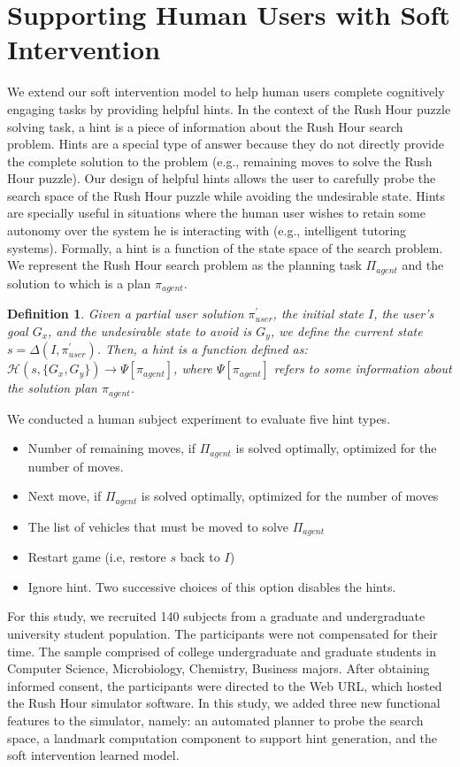 \documentclass[doctor]{thesis} %
\theoremstyle{plain}
\newtheorem{definition}{Definition}
\begin{document}
\section*{Supporting Human Users with Soft Intervention}
We extend our soft intervention model to help human users complete cognitively engaging tasks by providing helpful hints. In the context of the Rush Hour puzzle solving task, a hint is a piece of information about the Rush Hour search problem. Hints are a special type of answer because they do not directly provide the complete solution to the problem (e.g., remaining moves to solve the Rush Hour puzzle). Our design of helpful hints allows the user to carefully probe the search space of the Rush Hour puzzle while avoiding the undesirable state. Hints are specially useful in situations where the human user wishes to retain some autonomy over the system he is interacting with (e.g., intelligent tutoring systems).
Formally, a hint is a function of the state space of the search problem. We represent the Rush Hour search problem as the planning task $\Pi_{agent}$ and the solution to which is a plan $\pi_{agent}$.
\begin{definition}
Given a partial user solution $\pi^\prime _{user}$, the initial state $I$, the user's goal $G_x$, and the undesirable state to avoid is $G_y$, we define the current state $s = \Delta (I,\pi^\prime _{user})$. Then, a hint is a function defined as: $\mathcal{H}(s,\lbrace G_x,G_y\rbrace) \rightarrow \Psi[\pi_{agent}]$, where $\Psi[\pi_{agent}]$ refers to some information about the solution plan $\pi_{agent}$.
\end{definition}
We conducted a human subject experiment to evaluate five hint types.
\begin{itemize}
\item Number of remaining moves, if $\Pi_{agent}$ is solved optimally, optimized for the number of moves.
\item Next move, if $\Pi_{agent}$ is solved optimally, optimized for the number of moves
\item The list of vehicles that must be moved to solve $\Pi_{agent}$
\item Restart game (i.e, restore $s$ back to $I$)
\item Ignore hint. Two successive choices of this option disables the hints.
\end{itemize}

For this study, we recruited 140 subjects from a graduate and undergraduate university student population. The participants were not compensated for their time. The sample comprised of college undergraduate and graduate students in Computer Science, Microbiology, Chemistry, Business majors. After obtaining informed consent, the participants were directed to the Web URL, which hosted the Rush Hour simulator software. In this study, we added three new functional features to the simulator, namely: an automated planner to probe the search space, a landmark computation component to support hint generation, and the soft intervention learned model.
\end{document}
